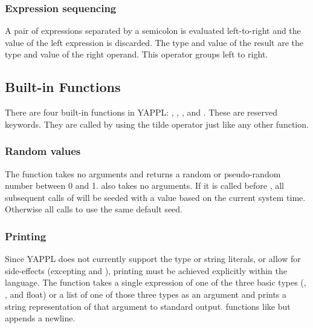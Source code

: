 \subsubsection{Expression sequencing}
A pair of expressions separated by a semicolon is evaluated left-to-right and the value of the left expression is discarded. The type and value of the result are the type and value of the right operand. This operator groups left to right.
\begin{alltt}
\quad {} \term{;} 
\end{alltt}

\subsection{Built-in Functions}
There are four built-in functions in YAPPL: , , , and . These are  reserved keywords. They are called by using the tilde operator just like any other function.

\subsubsection{Random values}
The function  takes no arguments and returns a random or pseudo-random number between 0 and 1.  also takes no arguments. If it is called before , all subsequent calls of  will be seeded with a value based on the current system time. Otherwise all calls to  use the same default seed.

\subsubsection{Printing}
Since YAPPL does not currently support the  type or string literals, or allow for side-effects (excepting  and ), printing must be achieved explicitly within the language. The  function takes a single expression of one of the three basic types (, , and {float}) or a list of one of those three types as an argument and prints a string representation of that argument to standard output.  functions like  but appends a newline.


